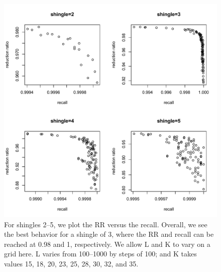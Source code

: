 \documentclass[aoas]{imsart}
\begin{document}
\begin{figure}[htbp]
\begin{center}
\includegraphics[width=\textwidth]{plots/syria_full_recall_rr_allShingles}
\caption{For shingles 2--5, we plot the RR versus the recall. Overall, we see the best behavior for a shingle of 3, where the RR and recall can be reached at 0.98 and 1, respectively. We allow L and K to vary on a grid here. L varies from 100--1000 by steps of 100; and K takes values 15, 18, 20, 23, 25, 28, 30, 32, and 35.}
\label{syria-takethatAssad}
\end{center}
\end{figure}
\end{document}
